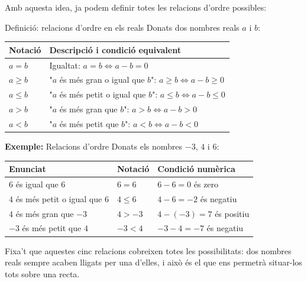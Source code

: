 Amb aquesta idea, ja podem definir totes les relacions d'ordre possibles:

\begin{definicio}{Definició: relacions d'ordre en els reals}
Donats dos nombres reals $a$ i $b$:

\begin{center}
\begin{tabularx}{\linewidth}{lY}
\toprule
\textbf{Notació} & \textbf{Descripció i condició equivalent} \\
\midrule
$a=b$ & Igualtat: $a=b \Longleftrightarrow a-b=0$ \\
$a \geq b$ & "$a$ és més gran o igual que $b$": $a \geq b \Longleftrightarrow a-b \geq 0$ \\
$a \leq b$ & "$a$ és més petit o igual que $b$": $a \leq b \Longleftrightarrow a-b \leq 0$ \\
$a > b$ & "$a$ és més gran que $b$": $a > b \Longleftrightarrow a-b > 0$ \\
$a < b$ & "$a$ és més petit que $b$": $a < b \Longleftrightarrow a-b < 0$ \\
\bottomrule
\end{tabularx}
\end{center}
\end{definicio}

\begin{exemple}{\textbf{Exemple:} Relacions d'ordre}
Donats els nombres $-3$, $4$ i $6$:

\begin{center}
\begin{tabular}{lll}
\toprule
\textbf{Enunciat} & \textbf{Notació} & \textbf{Condició numèrica} \\
\midrule
$6$ és igual que $6$ & $6 = 6$ & $6-6=0$ és zero \\
$4$ és més petit o igual que $6$ & $4 \leq 6$ & $4-6=-2$ és negatiu \\
$4$ és més gran que $-3$ & $4 > -3$ & $4-(-3)=7$ és positiu \\
$-3$ és més petit que $4$ & $-3 < 4$ & $-3-4=-7$ és negatiu \\
\bottomrule
\end{tabular}
\end{center}
\end{exemple}

Fixa't que aquestes cinc relacions cobreixen totes les possibilitats: dos nombres reals sempre acaben lligats per una d'elles, i això és el que ens permetrà situar-los tots sobre una recta.

